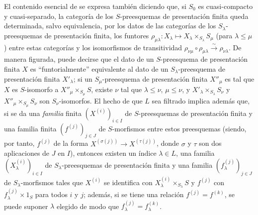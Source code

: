 \begin{env}[8.8.3]
\label{IV.8.8.3}
El contenido esencial de  se expresa también diciendo que, si $S_0$ es cuasi-compacto y cuasi-separado, la categoría de los $S$-preesquemas de presentación finita queda determinada, salvo equivalencia, por los datos de las categorías de los $S_\lambda$-preesquemas de presentación finita, los funtores $\rho_{\mu\lambda}:X_\lambda\mapsto X_\lambda\times_{S_\lambda}S_\mu$ (para $\lambda\leqslant\mu$) entre estas categorías y los isomorfismos de transitividad $\rho_{\nu\mu}\circ\rho_{\mu\lambda}\xrightarrow{\sim}\rho_{\nu\lambda}$.
De manera figurada, puede decirse que el dato de un $S$-preesquema de presentación finita $X$ es ``funtorialmente'' equivalente al dato de un $S_\lambda$-preesquema de presentación finita $X'_\lambda$; si un $S_\mu$-preesquema de presentación finita $X''_\mu$ es tal que $X$ es $S$-isomorfo a $X''_\mu\times_{S_\mu}S$, existe $\nu$ tal que $\lambda\leqslant\nu$, $\mu\leqslant\nu$, y $X'_\lambda\times_{S_\lambda}S_\nu$ y $X''_\mu\times_{S_\mu}S_\nu$ son $S_\nu$-isomorfos.
El hecho de que $L$ sea filtrado implica además que, si se da una \emph{familia} finita $(X^{(i)})_{i\in I}$ de $S$-preesquemas de presentación finita y una familia finita $(f^{(j)})_{j\in J}$ de $S$-morfismos entre estos preesquemas (siendo, por tanto, $f^{(j)}$ de la forma $X^{(\sigma(j))}\to X^{(\tau(j))}$, donde $\sigma$ y $\tau$ son dos aplicaciones de $J$ en $I$), entonces existen un índice $\lambda\in L$, una familia $(X^{(i)}_\lambda)_{i\in I}$ de $S_\lambda$-preesquemas de presentación finita y una familia $(f^{(j)}_\lambda)_{j\in J}$ de $S_\lambda$-morfismos tales que $X^{(i)}$ se identifica con $X^{(i)}_\lambda\times_{S_\lambda}S$ y $f^{(j)}$ con $f^{(j)}_\lambda\times 1_S$ para todos $i$ y $j$; además, si se tiene una relación $f^{(j)}=f^{(k)}$, se puede suponer $\lambda$ elegido de modo que $f^{(j)}_\lambda=f^{(k)}_\lambda$.


\end{env}
